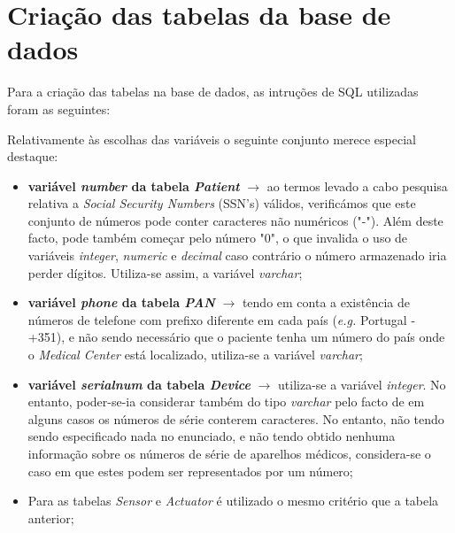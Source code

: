 \documentclass[a4paper]{article}
\begin{document}
\lstset{language=Pascal}


\tableofcontents
{}
\pagebreak

\section{Criação das tabelas da base de dados}
Para a criação das tabelas na base de dados, as intruções de SQL utilizadas foram as seguintes:



Relativamente às escolhas das variáveis o seguinte conjunto merece especial destaque:
\begin{itemize}

  \item \textbf{variável \textit{number} da tabela \textit{Patient}} $\rightarrow$ ao termos levado a cabo pesquisa relativa a \textit{Social Security Numbers} (SSN's) válidos, verificámos que este conjunto de números pode conter caracteres não numéricos ("-"). Além deste facto, pode também começar pelo número "0", o que invalida o uso de variáveis \textit{integer}, \textit{numeric} e \textit{decimal} caso contrário o número armazenado iria perder dígitos. Utiliza-se assim, a variável \textit{varchar};
  
  \item \textbf{variável \textit{phone} da tabela \textit{PAN}} $\rightarrow$ tendo em conta a existência de números de telefone com prefixo diferente em cada país (\textit{e.g.} Portugal - +351), e não sendo necessário que o paciente tenha um número do país onde o \textit{Medical Center} está localizado, utiliza-se a variável \textit{varchar};
  
  \item \textbf{variável \textit{serialnum} da tabela \textit{Device}} $\rightarrow$ utiliza-se a variável \textit{integer}. No entanto, poder-se-ia considerar também do tipo \textit{varchar} pelo facto de em alguns casos os números de série conterem caracteres. No entanto, não tendo sendo especificado nada no enunciado, e não tendo obtido nenhuma informação sobre os números de série de aparelhos médicos, considera-se o caso em que estes podem ser representados por um número;
  
  \item Para as tabelas \textit{Sensor} e \textit{Actuator} é utilizado o mesmo critério que a tabela anterior;
  

\end{itemize}
\end{document}
